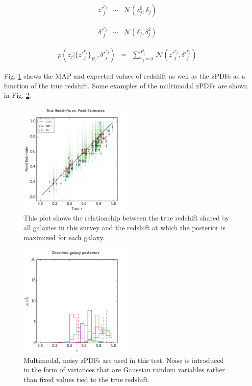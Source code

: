 \documentclass[preprint]{aastex}
\begin{document}
\begin{eqnarray}
\label{eq:zshift-milti}
z'^{r_{j}}_{j} &\sim& \mathcal{N}(z_{j}^{0},\delta_{j})
\end{eqnarray}

\begin{eqnarray}
\label{eq:znoise-multi}
\delta'^{r_{j}}_{j} &\sim& \mathcal{N}(\delta_{j},\delta^{2}_{j})
\end{eqnarray}

\begin{eqnarray}
\label{eq:zmany}
p(z_{j}|\{z'^{r_{j}}_{j}\}_{R_{j}},\delta'^{r_{j}}_{j}) &=& \sum_{r_{j}=0}^{R_{j}}\ \mathcal{N}(z'^{r_{j}}_{j},\delta'^{r_{j}}_{j})
\end{eqnarray}

Fig. \ref{fig:multicat} shows the MAP and expected values of redshift as well as the zPDFs as a function of the true redshift.  Some examples of the multimodal zPDFs are shown in Fig. \ref{fig:multipzs}.

\begin{figure}
\includegraphics[width=0.5\textwidth]{multi/truevmap.png}
\caption{This plot shows the relationship between the true redshift shared by all galaxies in this survey and the redshift at which the posterior is maximized for each galaxy.}
\label{fig:multicat}
\end{figure}

\begin{figure}
\includegraphics[width=0.5\textwidth]{multi/samplepzs.png}
\caption{Multimodal, noisy zPDFs are used in this test.  Noise is introduced in the form of variances that are Gaussian random variables rather than fixed values tied to the true redshift.}
\label{fig:multipzs}
\end{figure}
\end{document}

